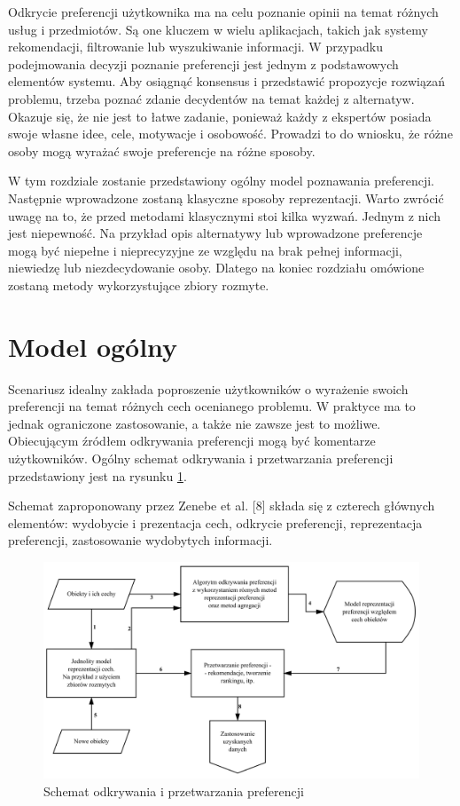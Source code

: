 Odkrycie preferencji użytkownika ma na celu poznanie opinii na temat różnych 
usług i przedmiotów. Są one kluczem w wielu aplikacjach, takich jak systemy 
rekomendacji, filtrowanie lub wyszukiwanie informacji. W przypadku podejmowania 
decyzji poznanie preferencji jest jednym z podstawowych elementów systemu. Aby 
osiągnąć konsensus i przedstawić propozycje rozwiązań problemu, trzeba poznać 
zdanie decydentów na temat każdej z alternatyw. Okazuje się, że nie jest to 
łatwe zadanie, ponieważ każdy z ekspertów posiada swoje własne idee, cele, 
motywacje i osobowość. Prowadzi to do wniosku, że różne osoby mogą wyrażać 
swoje preferencje na różne sposoby.

W tym rozdziale zostanie przedstawiony ogólny model poznawania preferencji. 
Następnie wprowadzone zostaną klasyczne sposoby reprezentacji. Warto zwrócić 
uwagę na to, że przed metodami klasycznymi stoi kilka wyzwań. Jednym z nich 
jest niepewność. Na przykład opis alternatywy lub wprowadzone preferencje mogą 
być niepełne i nieprecyzyjne ze względu na brak pełnej informacji, niewiedzę 
lub niezdecydowanie osoby. Dlatego na koniec rozdziału omówione zostaną metody 
wykorzystujące zbiory rozmyte.


\section{Model ogólny}
Scenariusz idealny zakłada poproszenie użytkowników o wyrażenie swoich 
preferencji na temat różnych cech ocenianego problemu. W praktyce ma to jednak 
ograniczone zastosowanie, a także nie zawsze jest to możliwe. Obiecującym 
źródłem odkrywania preferencji mogą być komentarze użytkowników. Ogólny schemat 
odkrywania i przetwarzania preferencji przedstawiony jest na rysunku
\ref{fig:ogolny_model_preferencji}.

Schemat zaproponowany przez Zenebe et al. [8] składa się z czterech głównych 
elementów: wydobycie i prezentacja cech, odkrycie preferencji, reprezentacja 
preferencji, zastosowanie wydobytych informacji.

\begin{figure}[ht]
  \includegraphics[width=\linewidth]
  	{chapters/preferences/ogolny_model_preferencji}
  \caption{Schemat odkrywania i przetwarzania preferencji}
  \label{fig:ogolny_model_preferencji}
\end{figure}

